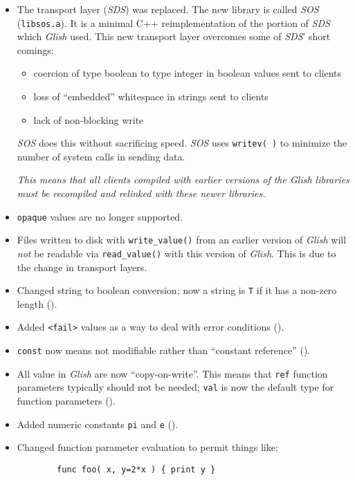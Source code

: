 \begin{itemize}
\item The transport layer (\emph{SDS}) was replaced. The new library is called
\emph{SOS} (\texttt{libsos.a}). It is a minimal C++ reimplementation of the portion
of \emph{SDS} which \emph{Glish} used. This new transport layer overcomes some of \emph{SDS}'
short comings:
\begin{itemize}
\item coercion of type boolean to type integer in boolean values
sent to clients
\item loss of ``embedded'' whitespace in strings sent to clients
\item lack of non-blocking write
\end{itemize}
\emph{SOS} does this without sacrificing speed. \emph{SOS} uses \texttt{writev( )}
to minimize the number of system calls in sending data.

\emph{This means that all clients compiled with earlier versions of the
\emph{Glish}
libraries must be recompiled and relinked with these newer libraries.}

\item \texttt{opaque} values are no longer supported.

\item Files written to disk with \texttt{write\_value()} from an earlier version
of \emph{Glish} will \emph{not} be readable via \texttt{read\_value()} with this version of
\emph{Glish}. This is due to the change in transport layers.

\item Changed string to boolean conversion; now a string is \texttt{T} if
it has a non-zero length ().

\item Added \verb+<fail>+ values as a way to deal with error conditions
().

\item \texttt{const} now means not modifiable rather than ``constant reference''
().

\item All value in \emph{Glish} are now ``copy-on-write''.  This means that
\texttt{ref} function parameters typically  should not be needed; \texttt{val}
is now the default type for function parameters ().

\item Added numeric constants \texttt{pi} and \texttt{e} ().

\item Changed function parameter evaluation to permit things like:
\begin{verbatim}
        func foo( x, y=2*x ) { print y }
\end{verbatim}


\end{itemize}

